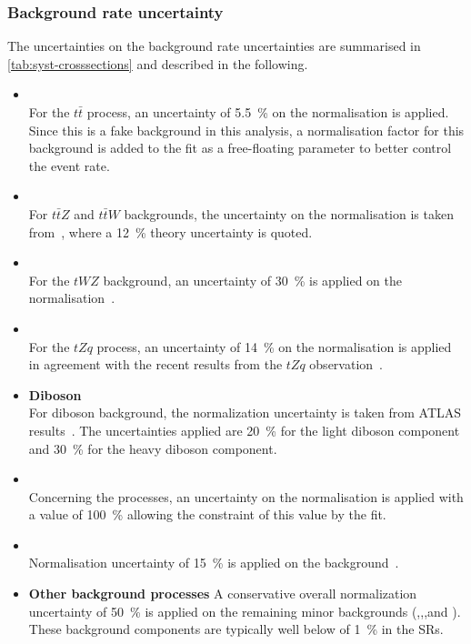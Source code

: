 \subsubsection{Background rate uncertainty} 
The uncertainties on the background rate uncertainties are summarised in
\cref{tab:syst-crosssections} and described in the following.
\begin{itemize}
	\item \textbf{\ttbar} \\
	For the $t\bar{t}$ process, an uncertainty of \SI{5.5}{\%} on the normalisation is applied. Since this is a fake background in this analysis, a normalisation factor for this background is added to the fit as a free-floating parameter to better control the event rate.
	\item \textbf{\ttV} \\
	For $t\bar{t}Z$ and $t\bar{t}W$ backgrounds, the uncertainty on the normalisation is taken from~\cite{ATL-COM-PHYS-2018-140}, where a \SI{12}{\%} theory uncertainty is quoted.
	\item \textbf{\tWZ} \\
	For the $tWZ$ background, an uncertainty of \SI{30}{\%} is applied on the normalisation~\cite{Bylund:2016qau}.
	\item \textbf{\tZq} \\
	For the $tZq$ process, an uncertainty of \SI{14}{\%} on the normalisation is applied in agreement with the recent results from the $tZq$ observation~\cite{Aad:2020wog}.
	\item \textbf{Diboson} \\
	For diboson background, the normalization uncertainty is taken from ATLAS results~\cite{STDM-2018-03}. The uncertainties applied are \SI{20}{\%} for the light diboson component and \SI{30}{\%} for the heavy diboson component. 
	\item \textbf{\Zjets} \\
	Concerning the \Zjets processes, an uncertainty on the normalisation is applied with a value of \SI{100}{\%} allowing the constraint of this value by the fit.
	\item \textbf{\ttH} \\
	Normalisation uncertainty of \SI{15}{\%} is applied on the \ttH background~\cite{Demartin:2016axk}. 
	\item \textbf{Other background processes} 
	A conservative overall normalization uncertainty of \SI{50}{\%} is applied
	on the remaining minor backgrounds (\ttt,\tttt,\VVV,\VH and \ttWW). 
	These background components are typically well below of \SI{1}{\%} in the SRs.
\end{itemize}

